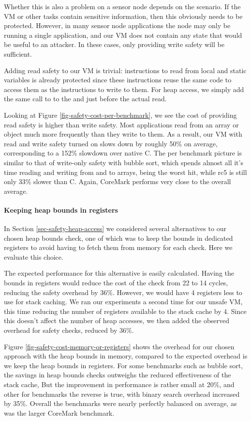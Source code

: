 Whether this is also a problem on a sensor node depends on the scenario. If the VM or other tasks contain sensitive information, then this obviously needs to be protected. However, in many sensor node applications the node may only be running a single application, and our VM does not contain any state that would be useful to an attacker. In these cases, only providing write safety will be sufficient.

Adding read safety to our VM is trivial: instructions to read from local and static variables is already protected since these instructions reuse the same code to access them as the instructions to write to them. For heap access, we simply add the same call to  to the  and  just before the actual read.

Looking at Figure \ref{fig-safety-cost-per-benchmark}, we see the cost of providing read safety is higher than write safety. Most applications read from an array or object much more frequently than they write to them. As a result, our VM with read and write safety turned on slows down by roughly 50\% on average, corresponding to a 152\% slowdown over native C. The per benchmark picture is similar to that of write-only safety with bubble sort, which spends almost all it's time reading and writing from and to arrays, being the worst hit, while rc5 is still only 33\% slower than C. Again, CoreMark performs very close to the overall average.

\paragraph{Keeping heap bounds in registers}
In Section \ref{sec-safety-heap-access} we considered several alternatives to our chosen heap bounds check, one of which was to keep the bounds in dedicated registers to avoid having to fetch them from memory for each check. Here we evaluate this choice.

The expected performance for this alternative is easily calculated. Having the bounds in registers would reduce the cost of the check from 22 to 14 cycles, reducing the safety overhead by 36\%. However, we would have 4 registers less to use for stack caching. We ran our experiments a second time for our unsafe VM, this time reducing the number of registers available to the stack cache by 4. Since this doesn't affect the number of heap accesses, we then added the observed overhead for safety checks, reduced by 36\%.

Figure \ref{fig-safety-cost-memory-or-registers} shows the overhead for our chosen approach with the heap bounds in memory, compared to the expected overhead is we keep the heap bounds in registers. For some benchmarks such as bubble sort, the savings in heap bounds checks outweighs the reduced effectiveness of the stack cache, But the improvement in performance is rather small at 20\%, and other for benchmarks the reverse is true, with binary search overhead increased by 35\%. Overall the benchmarks were nearly perfectly balanced on average, as was the larger CoreMark benchmark.

